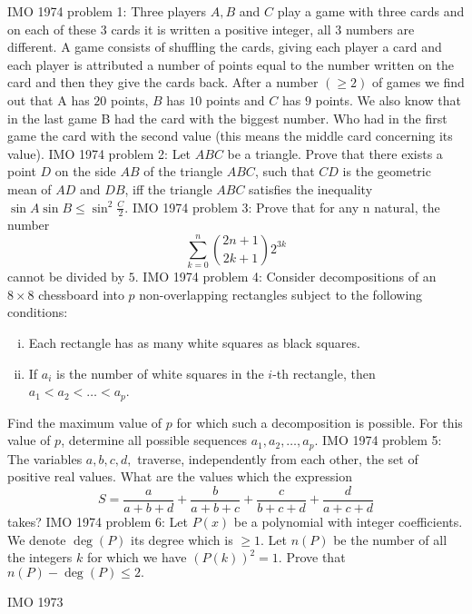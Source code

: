 IMO 1974 problem 1:  Three players $A,B$ and $C$ play a game with three cards and on each of these $3$ cards it is written a positive integer, all $3$ numbers are different. A game consists of shuffling the cards, giving each player a card and each player is attributed a number of points equal to the number written on the card and then they give the cards back. After a number $(\geq 2)$ of games we find out that A has $20$ points, $B$ has $10$ points and $C$ has $9$ points. We also know that in the last game B had the card with the biggest number. Who had in the first game the card with the second value (this means the middle card concerning its value). 
IMO 1974 problem 2: Let $ABC$ be a triangle. Prove that there exists a point $D$ on the side $AB$ of the triangle $ABC$, such that $CD$ is the geometric mean of $AD$ and $DB$, iff the triangle $ABC$ satisfies the inequality $\sin A\sin B\le\sin^2\frac{C}{2}$.
IMO 1974 problem 3:  Prove that for any n natural, the number
\[ \sum \limits_{k=0}^n \binom{2n+1}{2k+1} 2^{3k} \]
cannot be divided by $5$. 
IMO 1974 problem 4:  Consider decompositions of an $8\times 8$ chessboard into $p$ non-overlapping rectangles subject to the following conditions:
\begin{enumerate}[(i)]
  \item Each rectangle has as many white squares as black squares.
  \item If $a_i$ is the number of white squares in the $i$-th rectangle, then $a_1<a_2<\ldots <a_p$.
\end{enumerate}
Find the maximum value of $p$ for which such a decomposition is possible. For this value of $p$, determine all possible sequences $a_1,a_2,\ldots ,a_p$. 
IMO 1974 problem 5:  The variables $a,b,c,d,$ traverse, independently from each other, the set of positive real values. What are the values which the expression
\[ S= \frac{a}{a+b+d} + \frac{b}{a+b+c} + \frac{c}{b+c+d} + \frac{d}{a+c+d} \]
takes? 
IMO 1974 problem 6:  Let $P(x)$ be a polynomial with integer coefficients. We denote $\deg(P)$ its degree which is $\geq 1.$ Let $n(P)$ be the number of all the integers $k$ for which we have $(P(k))^2=1.$ Prove that $n(P)- \deg(P) \leq 2.$ 

IMO 1973 

